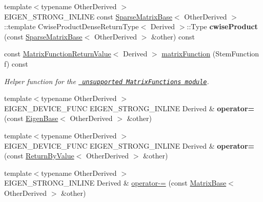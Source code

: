 \begin{DoxyCompactItemize}
\item 
\mbox{\label{class_eigen_1_1_matrix_base_a928341dba1dc4510b79b910e9f1fd156}} 
{\footnotesize template$<$typename Other\+Derived $>$ }\\E\+I\+G\+E\+N\+\_\+\+S\+T\+R\+O\+N\+G\+\_\+\+I\+N\+L\+I\+NE const \mbox{\hyperlink{class_eigen_1_1_sparse_matrix_base}{Sparse\+Matrix\+Base}}$<$ Other\+Derived $>$\+::template Cwise\+Product\+Dense\+Return\+Type$<$ Derived $>$\+::Type {\bfseries cwise\+Product} (const \mbox{\hyperlink{class_eigen_1_1_sparse_matrix_base}{Sparse\+Matrix\+Base}}$<$ Other\+Derived $>$ \&other) const
\item 
\mbox{\label{class_eigen_1_1_matrix_base_a1a6cc9f734eb175e785a1118305245fc}} 
const \mbox{\hyperlink{class_eigen_1_1_matrix_function_return_value}{Matrix\+Function\+Return\+Value}}$<$ Derived $>$ \mbox{\hyperlink{class_eigen_1_1_matrix_base_a1a6cc9f734eb175e785a1118305245fc}{matrix\+Function}} (Stem\+Function f) const
\begin{DoxyCompactList}\small\item\em Helper function for the \href{unsupported/group__MatrixFunctions__Module.html}{\texttt{ unsupported Matrix\+Functions module}}. \end{DoxyCompactList}\item 
\mbox{\label{class_eigen_1_1_matrix_base_a30a8896b83541998047f4377125a49ba}} 
{\footnotesize template$<$typename Other\+Derived $>$ }\\E\+I\+G\+E\+N\+\_\+\+D\+E\+V\+I\+C\+E\+\_\+\+F\+U\+NC E\+I\+G\+E\+N\+\_\+\+S\+T\+R\+O\+N\+G\+\_\+\+I\+N\+L\+I\+NE Derived \& {\bfseries operator=} (const \mbox{\hyperlink{struct_eigen_1_1_eigen_base}{Eigen\+Base}}$<$ Other\+Derived $>$ \&other)
\item 
\mbox{\label{class_eigen_1_1_matrix_base_ad7b20eb0484a6786289403a39ba1ef78}} 
{\footnotesize template$<$typename Other\+Derived $>$ }\\E\+I\+G\+E\+N\+\_\+\+D\+E\+V\+I\+C\+E\+\_\+\+F\+U\+NC E\+I\+G\+E\+N\+\_\+\+S\+T\+R\+O\+N\+G\+\_\+\+I\+N\+L\+I\+NE Derived \& {\bfseries operator=} (const \mbox{\hyperlink{class_eigen_1_1_return_by_value}{Return\+By\+Value}}$<$ Other\+Derived $>$ \&other)
\item 
{\footnotesize template$<$typename Other\+Derived $>$ }\\E\+I\+G\+E\+N\+\_\+\+S\+T\+R\+O\+N\+G\+\_\+\+I\+N\+L\+I\+NE Derived \& \mbox{\hyperlink{class_eigen_1_1_matrix_base_a777151d0c1c310c3bbfc0d203f774910}{operator-\/=}} (const \mbox{\hyperlink{class_eigen_1_1_matrix_base}{Matrix\+Base}}$<$ Other\+Derived $>$ \&other)

\end{DoxyCompactItemize}
